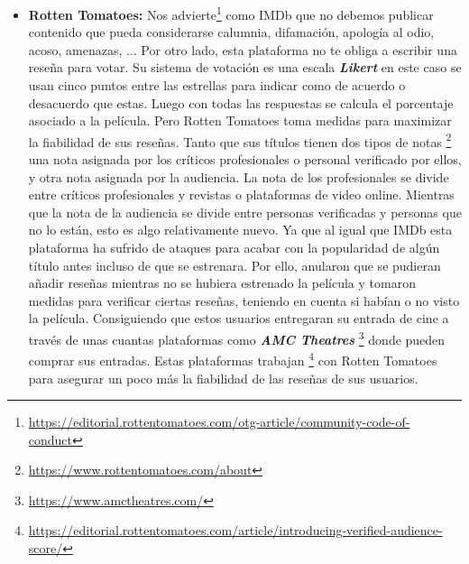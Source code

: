 \begin{itemize}
\item \textbf{Rotten Tomatoes:} Nos advierte\footnote{\url{https://editorial.rottentomatoes.com/otg-article/community-code-of-conduct}} como IMDb que no debemos publicar contenido que pueda considerarse calumnia, difamación, apología al odio, acoso, amenazas, ... Por otro lado, esta plataforma no te obliga a escribir una reseña para votar. Su sistema de votación es una escala \textbf{\textit{Likert}} \cite{Elikert} en este caso se usan cinco puntos entre las estrellas para indicar como de acuerdo o desacuerdo que estas. Luego con todas las respuestas se calcula el porcentaje asociado a la película. Pero Rotten Tomatoes toma medidas para maximizar la fiabilidad de sus reseñas. Tanto que sus títulos tienen dos tipos de notas \footnote{\url{https://www.rottentomatoes.com/about}} una nota asignada por los críticos profesionales o personal verificado por ellos, y otra nota asignada por la audiencia. La nota de los profesionales se divide entre críticos profesionales y revistas o plataformas de video online. Mientras que la nota de la audiencia se divide entre personas verificadas y personas que no lo están, esto es algo relativamente nuevo. Ya que al igual que IMDb esta plataforma ha sufrido de ataques para acabar con la popularidad de algún título antes incluso de que se estrenara. Por ello, anularon que se pudieran añadir reseñas mientras no se hubiera estrenado la película y tomaron medidas para verificar ciertas reseñas, teniendo en cuenta si habían o no visto la película. Consiguiendo que estos usuarios entregaran su entrada de cine a través de unas cuantas plataformas como  \textbf{\textit{AMC Theatres}} \footnote{\url{https://www.amctheatres.com/}} donde pueden comprar sus entradas. Estas plataformas trabajan \footnote{\url{https://editorial.rottentomatoes.com/article/introducing-verified-audience-score/}} con Rotten Tomatoes para asegurar un poco más la fiabilidad de las reseñas de sus usuarios.

\end{itemize}
